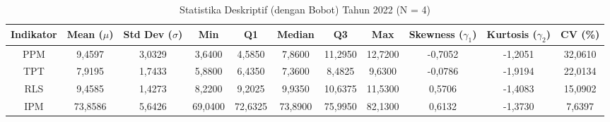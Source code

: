 \begin{table}[H]
\centering
\caption{Statistika Deskriptif (dengan Bobot) Tahun 2022 (N = 4)} \label{tab:sample1desc_2022}
\begin{adjustbox}{max width=\textwidth, max height=0.85\textheight}
\begin{tabular}{|c|c|c|c|c|c|c|c|c|c|c|}
\hline
\textbf{Indikator} & \textbf{Mean ($\mu$)} & \textbf{Std Dev ($\sigma$)} & \textbf{Min} & \textbf{Q1} & \textbf{Median} & \textbf{Q3} & \textbf{Max} & \textbf{Skewness ($\gamma_1$)} & \textbf{Kurtosis ($\gamma_2$)} & \textbf{CV (\%)} \\
\hline
PPM & 9,4597 & 3,0329 & 3,6400 & 4,5850 & 7,8600 & 11,2950 & 12,7200 & -0,7052 & -1,2051 & 32,0610 \\
TPT & 7,9195 & 1,7433 & 5,8800 & 6,4350 & 7,3600 & 8,4825 & 9,6300 & -0,0786 & -1,9194 & 22,0134 \\
RLS & 9,4585 & 1,4273 & 8,2200 & 9,2025 & 9,9350 & 10,6375 & 11,5300 & 0,5706 & -1,4083 & 15,0902 \\
IPM & 73,8586 & 5,6426 & 69,0400 & 72,6325 & 73,8900 & 75,9950 & 82,1300 & 0,6132 & -1,3730 & 7,6397 \\
\hline
\end{tabular}
\end{adjustbox}
\end{table}